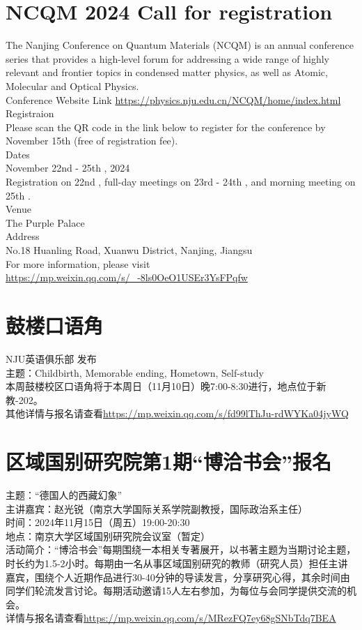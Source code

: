 \documentclass[letterpaper, 12pt]{article}
\begin{document}
\begin{multicols}{2}
\section{NCQM 2024 Call for registration}
The Nanjing Conference on Quantum Materials (NCQM) is an annual conference series that provides a high-level forum for addressing a wide range of highly relevant and frontier topics in condensed matter physics, as well as Atomic, Molecular and Optical Physics. \\
Conference Website Link \url{https://physics.nju.edu.cn/NCQM/home/index.html}\\
Registraion\\
Please scan the QR code in the link below to register for the conference by November 15th (free of registration fee).\\
Dates\\
November 22nd - 25th , 2024\\
Registration on 22nd , full-day meetings on 23rd - 24th , and morning meeting on 25th .\\
Venue\\
The Purple Palace\\
Address\\
No.18 Huanling Road, Xuanwu District, Nanjing, Jiangsu\\
For more information, please visit \url{https://mp.weixin.qq.com/s/_-8ls0OeO1USEr3YsFPqfw}

\section{鼓楼口语角}
NJU英语俱乐部 发布\\
主题：Childbirth, Memorable ending, Hometown, Self-study\\
本周鼓楼校区口语角将于本周日（11月10日）晚7:00-8:30进行，地点位于新教-202。\\
其他详情与报名请查看\url{https://mp.weixin.qq.com/s/fd99lThJu-rdWYKa04jyWQ}\\

\section{区域国别研究院第1期“博洽书会”报名}
主题：“德国人的西藏幻象”\\
主讲嘉宾：赵光锐（南京大学国际关系学院副教授，国际政治系主任）\\
时间：2024年11月15日（周五）19:00-20:30\\
地点：南京大学区域国别研究院会议室（暂定）\\
活动简介：“博洽书会”每期围绕一本相关专著展开，以书著主题为当期讨论主题，时长约为1.5-2小时。每期由一名从事区域国别研究的教师（研究人员）担任主讲嘉宾，围绕个人近期作品进行30-40分钟的导读发言，分享研究心得，其余时间由同学们轮流发言讨论。每期活动邀请15人左右参加，为每位与会同学提供交流的机会。\\
详情与报名请查看\url{https://mp.weixin.qq.com/s/MRezFQ7ey68gSNbTdq7BEA}\\


\end{multicols}
\end{document}
